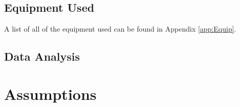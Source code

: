 \documentclass[paper=letter, fontsize=10pt]{scrartcl} %
\begin{document}
\subsection{Equipment Used}
A list of all of the equipment used can be found in Appendix \ref{app:Equip}.

\subsection{Data Analysis}

\section{Assumptions}








\end{document}
